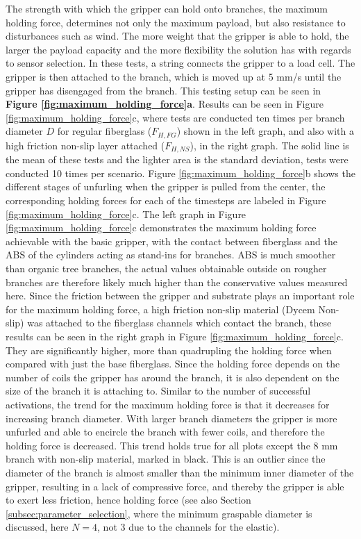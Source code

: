 The strength with which the gripper can hold onto branches, the maximum holding force, determines not only the maximum payload, but also resistance to disturbances such as wind. The more weight that the gripper is able to hold, the larger the payload capacity and the more flexibility the solution has with regards to sensor selection.
In these tests, a string connects the gripper to a load cell. The gripper is then attached to the branch, which is moved up at 5 mm/s until the gripper has disengaged from the branch. This testing setup can be seen in \textbf{Figure \ref{fig:maximum_holding_force}a}.
Results can be seen in {Figure \ref{fig:maximum_holding_force}c}, where tests are conducted ten times per branch diameter $D$ for regular fiberglass ($F_{
H,FG}$) shown in the left graph, and also with a high friction non-slip layer attached ($F_{H, NS}$), in the right graph. The solid line is the mean of these tests and the lighter area is the standard deviation, tests were conducted 10 times per scenario. Figure \ref{fig:maximum_holding_force}b shows the different stages of unfurling when the gripper is pulled from the center, the corresponding holding forces for each of the timesteps are labeled in Figure \ref{fig:maximum_holding_force}c.
The left graph in Figure \ref{fig:maximum_holding_force}c demonstrates the maximum holding force achievable with the basic gripper, with the contact between fiberglass and the ABS of the cylinders acting as stand-ins for branches. ABS is much smoother than organic tree branches, the actual values obtainable outside on rougher branches are therefore likely much higher than the conservative values measured here. Since the friction between the gripper and substrate plays an important role for the maximum holding force, a high friction non-slip material (Dycem Non-slip) was attached to the fiberglass channels which contact the branch, these results can be seen in the right graph in Figure \ref{fig:maximum_holding_force}c. They are significantly higher, more than quadrupling the holding force when compared with just the base fiberglass.
Since the holding force depends on the number of coils the gripper has around the branch, it is also dependent on the size of the branch it is attaching to. Similar to the number of successful activations, the trend for the maximum holding force is that it decreases for increasing branch diameter. With larger branch diameters the gripper is more unfurled and able to encircle the branch with fewer coils, and therefore the holding force is decreased. This trend holds true for all plots except the 8 mm branch with non-slip material, marked in black. This is an outlier since the diameter of the branch is almost smaller than the minimum inner diameter of the gripper, resulting in a lack of compressive force, and thereby the gripper is able to exert less friction, hence holding force (see also Section \ref{subsec:parameter_selection}, where the minimum graspable diameter is discussed, here $N=4$, not 3 due to the channels for the elastic).

